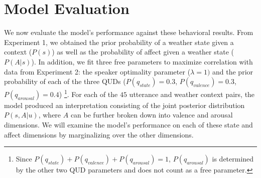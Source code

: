 \documentclass[10pt,letterpaper]{article}
\begin{document}
\section{Model Evaluation}
We now evaluate the model's performance against these behavioral results. From Experiment 1, we obtained the prior probability of a weather state given a context ($P(s)$) as well as the probability of affect given a weather state ($P(A | s)$). In addition, we fit three free parameters to maximize correlation with data from Experiment 2: the speaker optimality parameter ($\lambda = 1)$ and the prior probability of each of the three QUDs ($P(q_{state}) = 0.3$, $P(q_{valence}) = 0.3$, $P(q_{arousal}) = 0.4$) \footnote{Since $P(q_{state}) + P(q_{valence}) + P(q_{arousal}) = 1$, $P(q_{arousal})$ is determined by the other two QUD parameters and does not count as a free parameter.}.
For each of the $45$ utterance and weather context pairs, the model produced an interpretation consisting of the joint posterior distribution $P(s, A | u)$, where $A$ can be further broken down into valence and arousal dimensions. We will examine the model's performance on each of these state and affect dimensions by marginalizing over the other dimensions.
\end{document}

